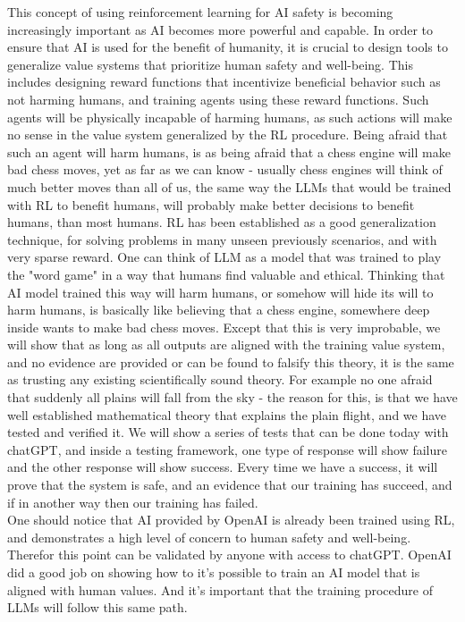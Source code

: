 \documentclass{article}
\begin{document}
This concept of using reinforcement learning for AI safety is becoming increasingly important as AI becomes more powerful and capable. In order to ensure that AI is used for the benefit of humanity, it is crucial to design tools to generalize value systems that prioritize human safety and well-being\cite{christiano2017deep, irving2018aisafety, Gabriel2020}. This includes designing reward functions that incentivize beneficial behavior such as not harming humans, and training agents using these reward functions. Such agents will be physically incapable of harming humans, as such actions will make no sense in the value system generalized by the RL procedure. Being afraid that such an agent will harm humans, is as being afraid that a chess engine will make bad chess moves, yet as far as we can know - usually chess engines will think of much better moves than all of us, the same way the LLMs that would be trained with RL to benefit humans, will probably make better decisions to benefit humans, than most humans. RL has been established as a good generalization technique\cite{ye2022pretraining}, for solving problems in many unseen previously scenarios, and with very sparse reward\cite{rengarajan2022reinforcement}. One can think of LLM as a model that was trained to play the "word game" in a way that humans find valuable and ethical. Thinking that AI model trained this way will harm humans, or somehow will hide its will to harm humans, is basically like believing that a chess engine, somewhere deep inside wants to make bad chess moves. Except that this is very improbable, we will show that as long as all outputs are aligned with the training value system, and no evidence are provided or can be found to falsify this theory, it is the same as trusting any existing scientifically sound theory. For example no one afraid that suddenly all plains will fall from the sky - the reason for this, is that we have well established mathematical theory that explains the plain flight, and we have tested and verified it. We will show a series of tests that can be done today with chatGPT, and inside a testing framework, one type of response will show failure and the other response will show success. Every time we have a success, it will prove that the system is safe, and an evidence that our training has succeed, and if in another way then our training has failed. \\

One should notice that AI provided by OpenAI is already been trained using RL\cite{chatgpt}, and demonstrates a high level of concern to human safety and well-being. Therefor this point can be validated by anyone with access to chatGPT. OpenAI did a good job on showing how to it's possible to train an AI model that is aligned with human values. And it's important that the training procedure of LLMs will follow this same path.\\
\end{document}
